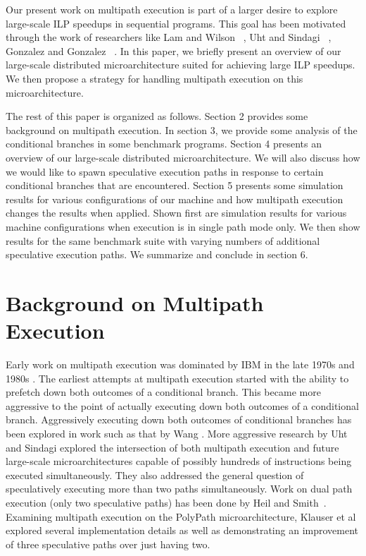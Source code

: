 \documentclass[10pt,dvips]{article}
\begin{document}
Our present work on multipath execution is part of a larger
desire to explore large-scale ILP speedups in sequential programs.
This goal has been motivated through the work of researchers like
Lam and Wilson ~\cite{Lam92},
Uht and Sindagi ~\cite{Uht95},
Gonzalez and Gonzalez ~\cite{Gon97}.
In this paper, we briefly present an overview of our large-scale distributed
microarchitecture suited for achieving large ILP speedups.  
We then propose a strategy for handling
multipath execution on this microarchitecture.

The rest of this paper is organized as follows.
Section 2 provides some background on multipath execution.
In section 3, we provide some analysis of the conditional
branches in some benchmark programs.  
Section 4 presents an overview of our large-scale distributed
microarchitecture.
We will also discuss how we
would like to 
spawn speculative execution paths
in response to certain conditional branches that 
are encountered.
Section 5 presents some simulation results for various
configurations of our machine and how multipath execution
changes the results when applied.  Shown first are simulation
results for various machine configurations when execution is in
single path mode only.  We then show results for
the same benchmark suite with varying numbers of additional
speculative execution paths.
We summarize and conclude in section 6.
%
\section{Background on Multipath Execution}
%
Early work on multipath execution was
dominated by IBM in the
late 1970s and 1980s \cite{Conners79}.
The earliest attempts at multipath
execution started with the ability to prefetch down both
outcomes of a conditional branch.  This became more aggressive
to the point of actually executing down both outcomes of
a conditional branch.  Aggressively executing down both outcomes
of conditional branches has been explored in work such as that by
Wang \cite{Wang90}.  
More aggressive research by Uht and
Sindagi \cite{Uht95} explored the intersection of both
multipath execution and future large-scale microarchitectures
capable of possibly hundreds of instructions being executed simultaneously.
They also addressed the general question of speculatively executing
more than two paths simultaneously.
Work on dual path execution (only two speculative paths) has
been done by Heil and Smith~\cite{Heil96}.
Examining multipath execution on the PolyPath microarchitecture,
Klauser et al explored several implementation details
as well as demonstrating an improvement of three speculative paths
over just having two.
\end{document}

